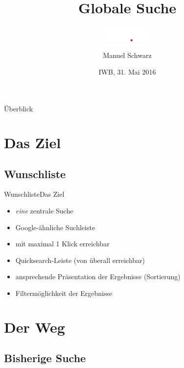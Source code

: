 \documentclass{beamer}
\title{Globale Suche}
\subtitle{\includegraphics[height=8mm]{../img/studip-logo@2x}}
\author{Manuel Schwarz}
\institute[Uni Osnabrück]{\inst{} virtUOS\\ Universität Osnabrück}
\date{IWB, 31. Mai 2016}
\begin{document}
\begin{frame}
    \titlepage
\end{frame}


\begin{frame}{Überblick}
    \tableofcontents
\end{frame}


\section{Das Ziel}
\subsection{Wunschliste}

\begin{frame}{Wunschliste}{Das Ziel}
    \begin{itemize}
        \item {\textit{eine} zentrale Suche\pause}
        \item {Google-ähnliche Suchleiste\pause}
        \item {mit maximal 1 Klick erreichbar\pause}
        \item {Quicksearch-Leiste (von überall erreichbar)\pause}
        \item {ansprechende Präsentation der Ergebnisse (Sortierung)\pause}
        \item {Filtermöglichkeit der Ergebnisse}
    \end{itemize}
\end{frame}


\section{Der Weg}
\subsection{Bisherige Suche}
\end{document}
